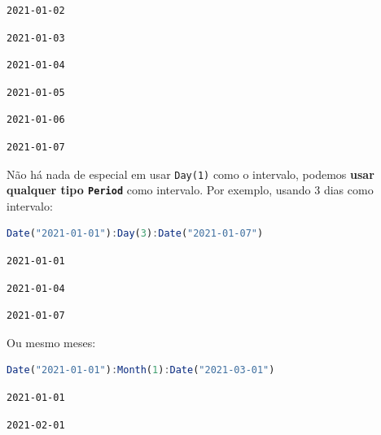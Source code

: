 \documentclass[
  notoc %
]{tufte-book}
\newcommand{\passthrough}[1]{#1}
\begin{document}
\begin{lstlisting}[language=Output]
2021-01-02
\end{lstlisting}

\begin{lstlisting}[language=Output]
2021-01-03
\end{lstlisting}

\begin{lstlisting}[language=Output]
2021-01-04
\end{lstlisting}

\begin{lstlisting}[language=Output]
2021-01-05
\end{lstlisting}

\begin{lstlisting}[language=Output]
2021-01-06
\end{lstlisting}

\begin{lstlisting}[language=Output]
2021-01-07
\end{lstlisting}

Não há nada de especial em usar \passthrough{\lstinline!Day(1)!} como o
intervalo, podemos \textbf{usar qualquer tipo
\passthrough{\lstinline!Period!}} como intervalo. Por exemplo, usando 3
dias como intervalo:

\begin{lstlisting}[language=Julia]
Date("2021-01-01"):Day(3):Date("2021-01-07")
\end{lstlisting}

\begin{lstlisting}[language=Output]
2021-01-01
\end{lstlisting}

\begin{lstlisting}[language=Output]
2021-01-04
\end{lstlisting}

\begin{lstlisting}[language=Output]
2021-01-07
\end{lstlisting}

Ou mesmo meses:

\begin{lstlisting}[language=Julia]
Date("2021-01-01"):Month(1):Date("2021-03-01")
\end{lstlisting}

\begin{lstlisting}[language=Output]
2021-01-01
\end{lstlisting}

\begin{lstlisting}[language=Output]
2021-02-01
\end{lstlisting}
\end{document}
